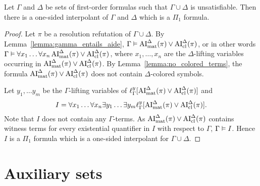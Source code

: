 \documentclass[,%
	draft=false,%
	numbers=noendperiod
	11pt,
	a4paper,
	oneside,%
	openany,
]{memoir}
\begin{document}
\begin{prop}
	Let $\Gamma$ and $\Delta$ be sets of first-order formulas such that $\Gamma\cup\Delta$ is unsatisfiable.
	Then there is a one-sided interpolant of $\Gamma$ and $\Delta$ which is a $\Pi_1$ formula.
\end{prop}
\begin{proof}
	Let $\pi$ be a resolution refutation of $\Gamma\cup\Delta$.
	By Lemma~\ref{lemma:gamma_entails_aide}, $\Gamma \vDash \operatorname{AI}_\mathrm{mat}^\Delta(\pi) \lor \operatorname{AI}_\mathrm{cl}^\Delta(\pi)$,
	or in other words
	$\Gamma \vDash \forall x_1 \dots \forall x_n  \operatorname{AI}_\mathrm{mat}^\Delta(\pi) \lor \operatorname{AI}_\mathrm{cl}^\Delta(\pi)$, where $x_1, \dots, x_n$ are the $\Delta$-lifting variables occurring in $\operatorname{AI}_\mathrm{mat}^\Delta(\pi) \lor \operatorname{AI}_\mathrm{cl}^\Delta(\pi)$.
	By Lemma~\ref{lemma:no_colored_terms}, the formula $\operatorname{AI}_\mathrm{mat}^\Delta(\pi) \lor \operatorname{AI}_\mathrm{cl}^\Delta(\pi)$ does not contain $\Delta$-colored symbols.

	Let $y_1, \dots y_m$ be the $\Gamma$-lifting variables of $\ell_{\Gamma}^{y}[\operatorname{AI}_\mathrm{mat}^\Delta(\pi) \lor \operatorname{AI}_\mathrm{cl}^\Delta(\pi)]$
	and
	\[I = \forall x_1 \dots \forall x_n \exists y_1 \dots \exists y_m \ell_{\Gamma}^{y}[\operatorname{AI}_\mathrm{mat}^\Delta(\pi) \lor \operatorname{AI}_\mathrm{cl}^\Delta(\pi)].\]
	Note that $I$ does not contain any $\Gamma$-terms.
	As $\operatorname{AI}_\mathrm{mat}^\Delta(\pi) \lor \operatorname{AI}_\mathrm{cl}^\Delta(\pi)$ contains witness terms for every existential quantifier in $I$ with respect to $\Gamma$, $\Gamma \vDash I$.
	Hence $I$ is a $\Pi_1$ formula which is a one-sided interpolant for $\Gamma \cup \Delta$.
\end{proof}


\section{Auxiliary sets}
\end{document}
